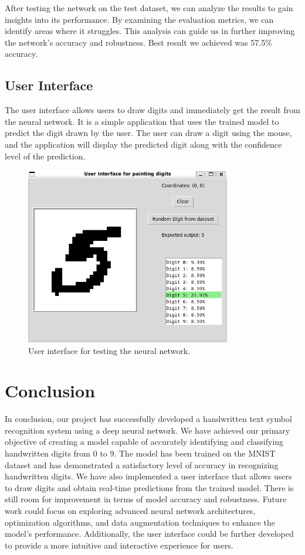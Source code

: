 \documentclass{article}
\begin{document}
After testing the network on the test dataset, we can analyze the results to gain insights into its performance. By examining the evaluation metrics, we can identify areas where it struggles. This analysis can guide us in further improving the network's accuracy and robustness.
Best result we achieved was 57.5\% accuracy.

\subsection{User Interface}

The user interface allows users to draw digits and immediately get the result from the neural network.
It is a simple application that uses the trained model to predict the digit drawn by the user.
The user can draw a digit using the mouse, and the application will display the predicted digit along with the confidence level of the prediction.

\begin{figure}[ht]
    \centering 
    \includegraphics[width=0.8\textwidth]{images/ui.png}
    \caption{User interface for testing the neural network.}
    \label{fig:ui}
\end{figure}

\clearpage
\newpage
\section{Conclusion}
In conclusion, our project has successfully developed a handwritten text symbol recognition system using a deep neural network.
We have achieved our primary objective of creating a model capable of accurately identifying and classifying handwritten digits from 0 to 9.
The model has been trained on the MNIST dataset and has demonstrated a satisfactory level of accuracy in recognizing handwritten digits.
We have also implemented a user interface that allows users to draw digits and obtain real-time predictions from the trained model.
There is still room for improvement in terms of model accuracy and robustness.
Future work could focus on exploring advanced neural network architectures, optimization algorithms, and data augmentation techniques to enhance the model's performance.
Additionally, the user interface could be further developed to provide a more intuitive and interactive experience for users.

\printbibliography 
\end{document}
